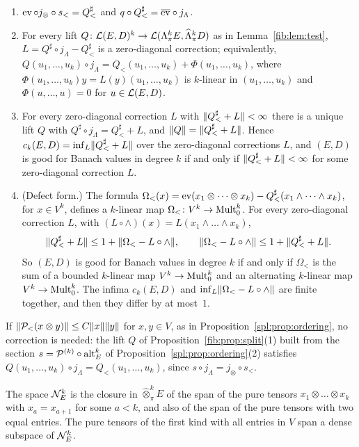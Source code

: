 \begin{theorem}\label{ob:thm:ordering}
\begin{enumerate}
\item $\operatorname{ev}\circ j_\otimes\circ s_<=Q^\sharp_<$ and $q\circ Q^\sharp_<=\overline{\operatorname{ev}}\circ j_\Lambda$.
\item For every lift $Q\colon\mathcal L(E,D)^k\to\mathcal L(\Lambda^k_\pi E,\widehat\Lambda^k_\pi D)$ as in Lemma~\ref{fib:lem:test},
$L=Q^\sharp\circ j_\Lambda-Q^\sharp_<$ is a zero-diagonal correction; equivalently,
$Q(u_1,\dots,u_k)\circ j_\Lambda=Q_<(u_1,\dots,u_k)+\Phi(u_1,\dots,u_k)$, where $\Phi(u_1,\dots,u_k)y=L(y)(u_1,\dots,u_k)$ is
$k$-linear in $(u_1,\dots,u_k)$ and $\Phi(u,\dots,u)=0$ for $u\in\mathcal L(E,D)$.
\item For every zero-diagonal correction $L$ with $\lVert Q^\sharp_<+L\rVert<\infty$ there is a unique lift $Q$ with
$Q^\sharp\circ j_\Lambda=Q^\sharp_<+L$, and $\lVert Q\rVert=\lVert Q^\sharp_<+L\rVert$. Hence $c_k(E,D)=\inf_L\lVert Q^\sharp_<+L\rVert$ over the
zero-diagonal corrections $L$, and $(E,D)$ is good for Banach values in degree $k$ if and only if $\lVert Q^\sharp_<+L\rVert<\infty$
for some zero-diagonal correction $L$.
\item \textup{(Defect form.)} The formula
$\Omega_<(x)=\operatorname{ev}(x_1\otimes\dots\otimes x_k)-Q^\sharp_<(x_1\wedge\dots\wedge x_k)$, for $x\in V^k$, defines a $k$-linear map
$\Omega_<\colon V^k\to\operatorname{Mult}^k_0$. For every zero-diagonal correction $L$, with $(L\circ\wedge)(x)=L(x_1\wedge\dots\wedge x_k)$,
\[
 \lVert Q^\sharp_<+L\rVert\le1+\lVert \Omega_<-L\circ\wedge\rVert,\qquad\lVert \Omega_<-L\circ\wedge\rVert\le1+\lVert Q^\sharp_<+L\rVert.
\]
So $(E,D)$ is good for Banach values in degree $k$ if and only if $\Omega_<$ is the sum of a bounded $k$-linear map
$V^k\to\operatorname{Mult}^k_0$ and an alternating $k$-linear map $V^k\to\operatorname{Mult}^k_0$. The infima $c_k(E,D)$ and
$\inf_L\lVert \Omega_<-L\circ\wedge\rVert$ are finite together, and then they differ by at most~$1$.
\end{enumerate}
\end{theorem}

If $\lVert \mathcal P_<(x\otimes y)\rVert\le C\lVert x\rVert\lVert y\rVert$ for $x,y\in V$, as in Proposition~\ref{spl:prop:ordering}, no correction is
needed: the lift $Q$ of
Proposition~\ref{fib:prop:split}(1) built from the section $s=\mathcal P^{(k)}\circ\operatorname{alt}^k_E$ of
Proposition~\ref{spl:prop:ordering}(2) satisfies $Q(u_1,\dots,u_k)\circ j_\Lambda=Q_<(u_1,\dots,u_k)$, since
$s\circ j_\Lambda=j_\otimes\circ s_<$.

\begin{lemma}\label{ob:lem:repeated}
The space $\mathcal N^k_E$ is the closure in $\widehat\otimes^k_\pi E$ of the span of the pure tensors $x_1\otimes\dots\otimes x_k$
with $x_a=x_{a+1}$ for some $a<k$, and also of the span of the pure tensors with two equal entries. The pure tensors of the
first kind with all entries in $V$ span a dense subspace of $\mathcal N^k_E$.
\end{lemma}

